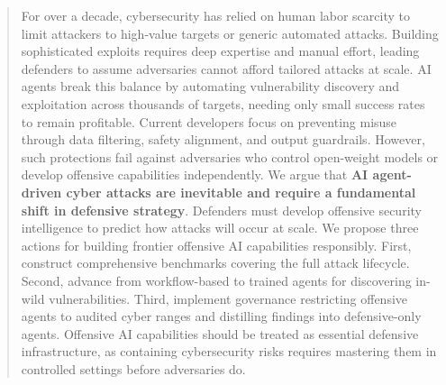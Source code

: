 \documentclass{article}
\theoremstyle{plain}
\theoremstyle{definition}
\theoremstyle{remark}
\begin{document}



\printAffiliationsAndNotice{}  %

\begin{abstract}
For over a decade, cybersecurity has relied on human labor scarcity to limit attackers to high-value targets or generic automated attacks. Building sophisticated exploits requires deep expertise and manual effort, leading defenders to assume adversaries cannot afford tailored attacks at scale. AI agents break this balance by automating vulnerability discovery and exploitation across thousands of targets, needing only small success rates to remain profitable. Current developers focus on preventing misuse through data filtering, safety alignment, and output guardrails. However, such protections fail against adversaries who control open-weight models or develop offensive capabilities independently. We argue that \textbf{AI agent-driven cyber attacks are inevitable and require a fundamental shift in defensive strategy}. Defenders must develop offensive security intelligence to predict how attacks will occur at scale. We propose three actions for building frontier offensive AI capabilities responsibly. First, construct comprehensive benchmarks covering the full attack lifecycle. Second, advance from workflow-based to trained agents for discovering in-wild vulnerabilities. Third, implement governance restricting offensive agents to audited cyber ranges and distilling findings into defensive-only agents. Offensive AI capabilities should be treated as essential defensive infrastructure, as containing cybersecurity risks requires mastering them in controlled settings before adversaries do.

\end{abstract}
\end{document}
